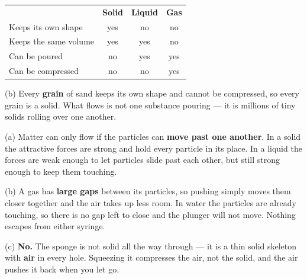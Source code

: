 \documentclass[12pt,a4paper]{article}
\begin{document}
\noindent
\begin{tabularx}{\linewidth}{@{}Xccc@{}}
  & \textbf{Solid} & \textbf{Liquid} & \textbf{Gas} \\
  Keeps its own shape   & yes & no  & no  \\
  Keeps the same volume & yes & yes & no  \\
  Can be poured         & no  & yes & yes \\
  Can be compressed     & no  & no  & yes \\
\end{tabularx}

\smallskip
\noindent (b) Every \textbf{grain} of sand keeps its own shape and cannot be
compressed, so every grain is a solid. What flows is not one substance pouring --- it
is millions of tiny solids rolling over one another.

\smallskip
{}

\noindent (a) Matter can only flow if the particles can \textbf{move past one
another}. In a solid the attractive forces are strong and hold every particle in its
place. In a liquid the forces are weak enough to let particles slide past each other,
but still strong enough to keep them touching.

\smallskip
\noindent (b) A gas has \textbf{large gaps} between its particles, so pushing simply
moves them closer together and the air takes up less room. In water the particles are
already touching, so there is no gap left to close and the plunger will not move.
Nothing escapes from either syringe.

\smallskip
\noindent (c) \textbf{No.} The sponge is not solid all the way through --- it is a thin
solid skeleton with \textbf{air} in every hole. Squeezing it compresses the air, not
the solid, and the air pushes it back when you let go.

\smallskip
{}
\end{document}
